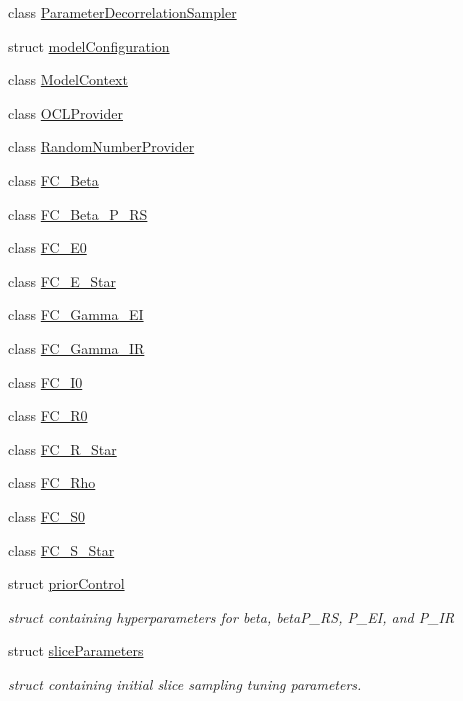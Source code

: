 \begin{DoxyCompactItemize}
class \hyperlink{classSpatialSEIR_1_1ParameterDecorrelationSampler}{Parameter\-Decorrelation\-Sampler}
\item 
struct \hyperlink{structSpatialSEIR_1_1modelConfiguration}{model\-Configuration}
\item 
class \hyperlink{classSpatialSEIR_1_1ModelContext}{Model\-Context}
\item 
class \hyperlink{classSpatialSEIR_1_1OCLProvider}{O\-C\-L\-Provider}
\item 
class \hyperlink{classSpatialSEIR_1_1RandomNumberProvider}{Random\-Number\-Provider}
\item 
class \hyperlink{classSpatialSEIR_1_1FC__Beta}{F\-C\-\_\-\-Beta}
\item 
class \hyperlink{classSpatialSEIR_1_1FC__Beta__P__RS}{F\-C\-\_\-\-Beta\-\_\-\-P\-\_\-\-R\-S}
\item 
class \hyperlink{classSpatialSEIR_1_1FC__E0}{F\-C\-\_\-\-E0}
\item 
class \hyperlink{classSpatialSEIR_1_1FC__E__Star}{F\-C\-\_\-\-E\-\_\-\-Star}
\item 
class \hyperlink{classSpatialSEIR_1_1FC__Gamma__EI}{F\-C\-\_\-\-Gamma\-\_\-\-E\-I}
\item 
class \hyperlink{classSpatialSEIR_1_1FC__Gamma__IR}{F\-C\-\_\-\-Gamma\-\_\-\-I\-R}
\item 
class \hyperlink{classSpatialSEIR_1_1FC__I0}{F\-C\-\_\-\-I0}
\item 
class \hyperlink{classSpatialSEIR_1_1FC__R0}{F\-C\-\_\-\-R0}
\item 
class \hyperlink{classSpatialSEIR_1_1FC__R__Star}{F\-C\-\_\-\-R\-\_\-\-Star}
\item 
class \hyperlink{classSpatialSEIR_1_1FC__Rho}{F\-C\-\_\-\-Rho}
\item 
class \hyperlink{classSpatialSEIR_1_1FC__S0}{F\-C\-\_\-\-S0}
\item 
class \hyperlink{classSpatialSEIR_1_1FC__S__Star}{F\-C\-\_\-\-S\-\_\-\-Star}
\item 
struct \hyperlink{structSpatialSEIR_1_1priorControl}{prior\-Control}
\begin{DoxyCompactList}\small\item\em struct containing hyperparameters for beta, beta\-P\-\_\-\-R\-S, P\-\_\-\-E\-I, and P\-\_\-\-I\-R \end{DoxyCompactList}\item 
struct \hyperlink{structSpatialSEIR_1_1sliceParameters}{slice\-Parameters}
\begin{DoxyCompactList}\small\item\em struct containing initial slice sampling tuning parameters. \end{DoxyCompactList}\item 

\end{DoxyCompactItemize}
